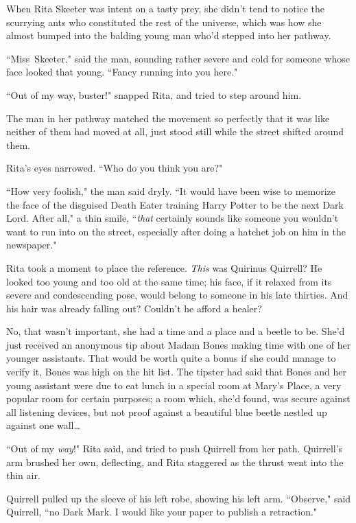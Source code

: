 
When Rita Skeeter was intent on a tasty prey, she didn't tend to notice the scurrying ants who constituted the rest of the universe, which was how she almost bumped into the balding young man who'd stepped into her pathway.

``Miss~Skeeter," said the man, sounding rather severe and cold for someone whose face looked that young. ``Fancy running into you here."

``Out of my way, buster!" snapped Rita, and tried to step around him.

The man in her pathway matched the movement so perfectly that it was like neither of them had moved at all, just stood still while the street shifted around them.

Rita's eyes narrowed. ``Who do you think you are?"

``How very foolish," the man said dryly. ``It would have been wise to memorize the face of the disguised Death Eater training Harry Potter to be the next Dark Lord. After all," a thin smile, ``\emph{that} certainly sounds like someone you wouldn't want to run into on the street, especially after doing a hatchet job on him in the newspaper."

Rita took a moment to place the reference. \emph{This} was Quirinus Quirrell? He looked too young and too old at the same time; his face, if it relaxed from its severe and condescending pose, would belong to someone in his late thirties. And his hair was already falling out? Couldn't he afford a healer?

No, that wasn't important, she had a time and a place and a beetle to be. She'd just received an anonymous tip about Madam Bones making time with one of her younger assistants. That would be worth quite a bonus if she could manage to verify it, Bones was high on the hit list. The tipster had said that Bones and her young assistant were due to eat lunch in a special room at Mary's Place, a very popular room for certain purposes; a room which, she'd found, was secure against all listening devices, but not proof against a beautiful blue beetle nestled up against one wall{\ldots}

``Out of my \emph{way}!" Rita said, and tried to push Quirrell from her path. Quirrell's arm brushed her own, deflecting, and Rita staggered as the thrust went into the thin air.

Quirrell pulled up the sleeve of his left robe, showing his left arm. ``Observe," said Quirrell, ``no Dark Mark. I would like your paper to publish a retraction."

